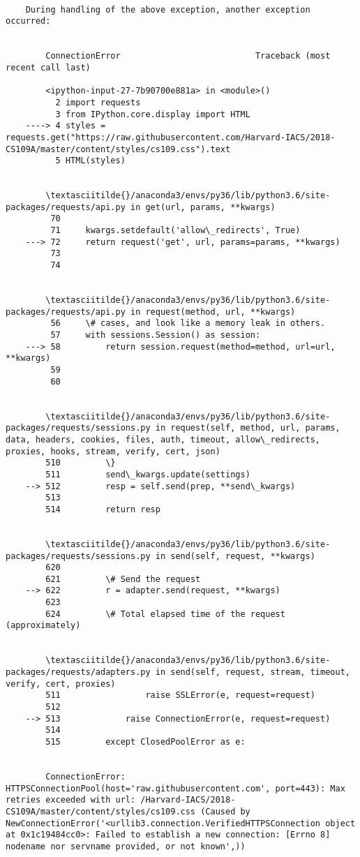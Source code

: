 \documentclass[11pt]{article}
\begin{document}
\begin{Verbatim}[commandchars=\\\{\}]
        
    During handling of the above exception, another exception occurred:


        ConnectionError                           Traceback (most recent call last)

        <ipython-input-27-7b90700e881a> in <module>()
          2 import requests
          3 from IPython.core.display import HTML
    ----> 4 styles = requests.get("https://raw.githubusercontent.com/Harvard-IACS/2018-CS109A/master/content/styles/cs109.css").text
          5 HTML(styles)


        \textasciitilde{}/anaconda3/envs/py36/lib/python3.6/site-packages/requests/api.py in get(url, params, **kwargs)
         70 
         71     kwargs.setdefault('allow\_redirects', True)
    ---> 72     return request('get', url, params=params, **kwargs)
         73 
         74 


        \textasciitilde{}/anaconda3/envs/py36/lib/python3.6/site-packages/requests/api.py in request(method, url, **kwargs)
         56     \# cases, and look like a memory leak in others.
         57     with sessions.Session() as session:
    ---> 58         return session.request(method=method, url=url, **kwargs)
         59 
         60 


        \textasciitilde{}/anaconda3/envs/py36/lib/python3.6/site-packages/requests/sessions.py in request(self, method, url, params, data, headers, cookies, files, auth, timeout, allow\_redirects, proxies, hooks, stream, verify, cert, json)
        510         \}
        511         send\_kwargs.update(settings)
    --> 512         resp = self.send(prep, **send\_kwargs)
        513 
        514         return resp


        \textasciitilde{}/anaconda3/envs/py36/lib/python3.6/site-packages/requests/sessions.py in send(self, request, **kwargs)
        620 
        621         \# Send the request
    --> 622         r = adapter.send(request, **kwargs)
        623 
        624         \# Total elapsed time of the request (approximately)


        \textasciitilde{}/anaconda3/envs/py36/lib/python3.6/site-packages/requests/adapters.py in send(self, request, stream, timeout, verify, cert, proxies)
        511                 raise SSLError(e, request=request)
        512 
    --> 513             raise ConnectionError(e, request=request)
        514 
        515         except ClosedPoolError as e:


        ConnectionError: HTTPSConnectionPool(host='raw.githubusercontent.com', port=443): Max retries exceeded with url: /Harvard-IACS/2018-CS109A/master/content/styles/cs109.css (Caused by NewConnectionError('<urllib3.connection.VerifiedHTTPSConnection object at 0x1c19484cc0>: Failed to establish a new connection: [Errno 8] nodename nor servname provided, or not known',))

    \end{Verbatim}
\end{document}
